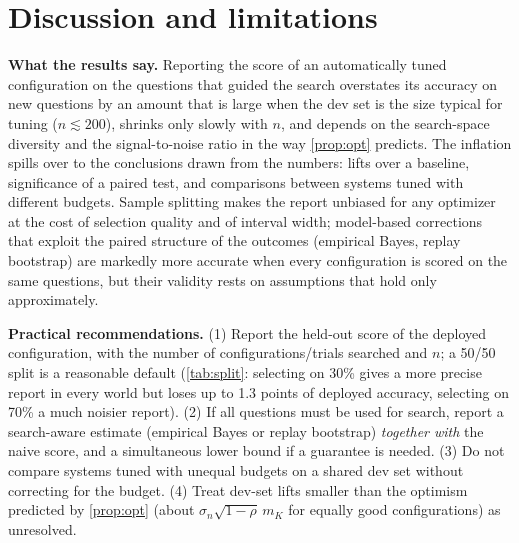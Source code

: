 \section{Discussion and limitations}
\label{sec:discussion}
\textbf{What the results say.} Reporting the score of an automatically tuned configuration on the questions that guided the search overstates its accuracy on new questions by an amount that is large when the dev set is the size typical for tuning ($n\lesssim 200$), shrinks only slowly with $n$, and depends on the search-space diversity and the signal-to-noise ratio in the way \cref{prop:opt} predicts. The inflation spills over to the conclusions drawn from the numbers: lifts over a baseline, significance of a paired test, and comparisons between systems tuned with different budgets. Sample splitting makes the report unbiased for any optimizer at the cost of selection quality and of interval width; model-based corrections that exploit the paired structure of the outcomes (empirical Bayes, replay bootstrap) are markedly more accurate when every configuration is scored on the same questions, but their validity rests on assumptions that hold only approximately.

\textbf{Practical recommendations.} (1) Report the held-out score of the deployed configuration, with the number of configurations/trials searched and $n$; a 50/50 split is a reasonable default (\cref{tab:split}: selecting on 30\% gives a more precise report in every world but loses up to 1.3 points of deployed accuracy, selecting on 70\% a much noisier report). (2) If all questions must be used for search, report a search-aware estimate (empirical Bayes or replay bootstrap) \emph{together with} the naive score, and a simultaneous lower bound if a guarantee is needed. (3) Do not compare systems tuned with unequal budgets on a shared dev set without correcting for the budget. (4) Treat dev-set lifts smaller than the optimism predicted by \cref{prop:opt} (about $\sigma_n\sqrt{1-\rho}\,m_K$ for equally good configurations) as unresolved.

